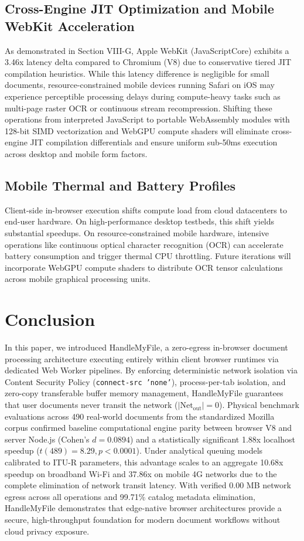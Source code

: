\documentclass[journal]{IEEEtran}
\begin{document}
\subsection{Cross-Engine JIT Optimization and Mobile WebKit Acceleration}
As demonstrated in Section VIII-G, Apple WebKit (JavaScriptCore) exhibits a 3.46x latency delta compared to Chromium (V8) due to conservative tiered JIT compilation heuristics. While this latency difference is negligible for small documents, resource-constrained mobile devices running Safari on iOS may experience perceptible processing delays during compute-heavy tasks such as multi-page raster OCR or continuous stream recompression. Shifting these operations from interpreted JavaScript to portable WebAssembly modules with 128-bit SIMD vectorization and WebGPU compute shaders will eliminate cross-engine JIT compilation differentials and ensure uniform sub-50ms execution across desktop and mobile form factors.

\subsection{Mobile Thermal and Battery Profiles}
Client-side in-browser execution shifts compute load from cloud datacenters to end-user hardware. On high-performance desktop testbeds, this shift yields substantial speedups. On resource-constrained mobile hardware, intensive operations like continuous optical character recognition (OCR) can accelerate battery consumption and trigger thermal CPU throttling. Future iterations will incorporate WebGPU compute shaders to distribute OCR tensor calculations across mobile graphical processing units.

\section{Conclusion}
In this paper, we introduced HandleMyFile, a zero-egress in-browser document processing architecture executing entirely within client browser runtimes via dedicated Web Worker pipelines. By enforcing deterministic network isolation via Content Security Policy (\texttt{connect-src 'none'}), process-per-tab isolation, and zero-copy transferable buffer memory management, HandleMyFile guarantees that user documents never transit the network ($|\text{Net}_{\text{out}}| = 0$). Physical benchmark evaluations across 490 real-world documents from the standardized Mozilla corpus confirmed baseline computational engine parity between browser V8 and server Node.js (Cohen's $d = 0.0894$) and a statistically significant 1.88x localhost speedup ($t(489) = 8.29, p < 0.0001$). Under analytical queuing models calibrated to ITU-R parameters, this advantage scales to an aggregate 10.68x speedup on broadband Wi-Fi and 37.86x on mobile 4G networks due to the complete elimination of network transit latency. With verified 0.00 MB network egress across all operations and 99.71\% catalog metadata elimination, HandleMyFile demonstrates that edge-native browser architectures provide a secure, high-throughput foundation for modern document workflows without cloud privacy exposure.
\end{document}
